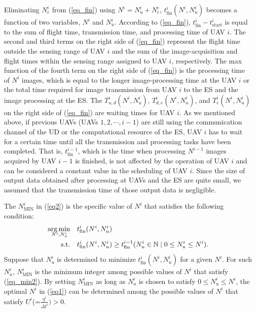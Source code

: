 \documentclass{ieeeaccess}
\begin{document}
Eliminating $N_e^i$ from (\ref{eq_fin}) using $N^i=N_u^i+N_e^i$, $t_{\mathrm{fin}}^i(N^i,N_u^i)$ becomes a function of two variables, $N^i$ and $N_u^i$. According to (\ref{eq_fin}), $t_{\mathrm{fin}}^i-t_{\mathrm{start}}^i$ is equal to the sum of flight time, transmission time, and processing time of UAV $i$. The second and third terms on the right side of (\ref{eq_fin}) represent the flight time outside the sensing range of UAV $i$ and the sum of the image-acquisition and flight times within the sensing range assigned to UAV $i$, respectively. The max function of the fourth term on the right side of (\ref{eq_fin}) is the processing time of $N^i$ images, which is equal to the longer image-processing time at the UAV $i$ or the total time required for image transmission from UAV $i$ to the ES and the image processing at the ES. The $T_{u,d}^{i}(N^i,N_u^i)$, $T_{d,e}^{i}(N^i,N_u^i)$, and $T_e^{i}(N^i,N_u^i)$ on the right side of (\ref{eq_fin}) are waiting times for UAV $i$. As we mentioned above, if previous UAVs (UAVs $1, 2, \cdots, i-1$) are still using the communication channel of the UD or the computational resource of the ES, UAV $i$ has to wait for a certain time until all the transmission and processing tasks have been completed. That is, $t_{\mathrm{fin}}^{i-1}$, which is the time when processing $N^{i-1}$ images acquired by UAV $i-1$ is finished, is not affected by the operation of UAV $i$ and can be considered a constant value in the scheduling of UAV $i$. Since the size of output data obtained after processing at UAVs and the ES are quite small, we assumed that the transmission time of those output data is negligible.

The ${N_\mathrm {MIN}^i}$ in (\ref{eq2}) is the specific value of $N^i$ that satisfies the following condition:
%
\begin{align}
\arg \min_{\hspace{-5mm}N^i,N_u^i} \quad& {t_{\mathrm{fin}}^i(N^i,N_u^i)}\label{eq_min1}\\
{\mathrm{s.t.}} \quad& {t_{\mathrm{fin}}^i(N^i,N_u^i)}\geq{t_{\mathrm{fin}}^{i-1}}({N_u^i}\in \mathbb{N}\mid 0\leq{N_u^i}\leq{N^i}). \label{eq_min2}
\end{align}
%
Suppose that ${N_u^i}$ is determined to minimize $t_{\mathrm{fin}}^i(N^i,N_u^i)$ for a given $N^i$. For such ${N_u^i}$, ${N_\mathrm {MIN}^i}$ is the minimum integer among possible values of $N^i$ that satisfy (\ref{eq_min2}). By setting ${N_\mathrm {MIN}^i}$ as long as ${N_u^i}$ is chosen to satisfy $0\leq{N_u^i}\leq{N^i}$, the optimal $N^i$ in (\ref{eq1}) can be determined among the possible values of $N^i$ that satisfy $U^i$(=$\frac{\eta^{i}}{{\Delta{t}}^i}) > 0$.
\end{document}
